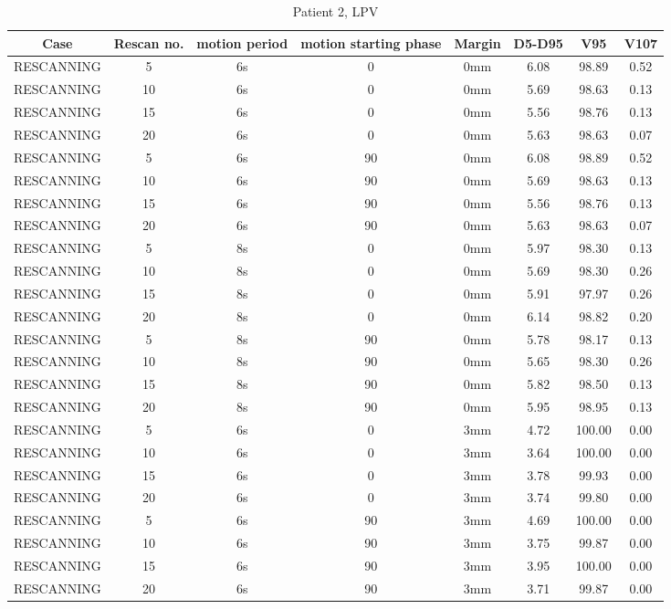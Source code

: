 \documentclass[type=dr, dr=rernat, accentcolor=tud7b,colorbacktitle, bigchapter, openright, twoside, 12pt ]{tudthesis}
\begin{document}
\begin{table}[H]
  \centering
   \scriptsize 
  \caption{Patient 2, LPV}
  \begin{tabular}{|c|c||c|c|c||c|c|c|}
    \hline\hline
    Case & Rescan no. & motion period & motion starting phase & Margin & D5-D95 & V95 & V107\\
    \hline 
RESCANNING & 5 & 6s & 0 & 0mm & 6.08 & 98.89 & 0.52 \\
RESCANNING & 10 & 6s & 0 & 0mm & 5.69 & 98.63 & 0.13 \\
RESCANNING & 15 & 6s & 0 & 0mm & 5.56 & 98.76 & 0.13 \\
RESCANNING & 20 & 6s & 0 & 0mm & 5.63 & 98.63 & 0.07 \\
RESCANNING & 5 & 6s & 90 & 0mm & 6.08 & 98.89 & 0.52 \\
RESCANNING & 10 & 6s & 90 & 0mm & 5.69 & 98.63 & 0.13 \\
RESCANNING & 15 & 6s & 90 & 0mm & 5.56 & 98.76 & 0.13 \\
RESCANNING & 20 & 6s & 90 & 0mm & 5.63 & 98.63 & 0.07 \\
RESCANNING & 5 & 8s & 0 & 0mm & 5.97 & 98.30 & 0.13 \\
RESCANNING & 10 & 8s & 0 & 0mm & 5.69 & 98.30 & 0.26 \\
RESCANNING & 15 & 8s & 0 & 0mm & 5.91 & 97.97 & 0.26 \\
RESCANNING & 20 & 8s & 0 & 0mm & 6.14 & 98.82 & 0.20 \\
RESCANNING & 5 & 8s & 90 & 0mm & 5.78 & 98.17 & 0.13 \\
RESCANNING & 10 & 8s & 90 & 0mm & 5.65 & 98.30 & 0.26 \\
RESCANNING & 15 & 8s & 90 & 0mm & 5.82 & 98.50 & 0.13 \\
RESCANNING & 20 & 8s & 90 & 0mm & 5.95 & 98.95 & 0.13 \\
RESCANNING & 5 & 6s & 0 & 3mm & 4.72 & 100.00 & 0.00 \\
RESCANNING & 10 & 6s & 0 & 3mm & 3.64 & 100.00 & 0.00 \\
RESCANNING & 15 & 6s & 0 & 3mm & 3.78 & 99.93 & 0.00 \\
RESCANNING & 20 & 6s & 0 & 3mm & 3.74 & 99.80 & 0.00 \\
RESCANNING & 5 & 6s & 90 & 3mm & 4.69 & 100.00 & 0.00 \\
RESCANNING & 10 & 6s & 90 & 3mm & 3.75 & 99.87 & 0.00 \\
RESCANNING & 15 & 6s & 90 & 3mm & 3.95 & 100.00 & 0.00 \\
RESCANNING & 20 & 6s & 90 & 3mm & 3.71 & 99.87 & 0.00 \\

\end{tabular}
\end{table}
\end{document}
